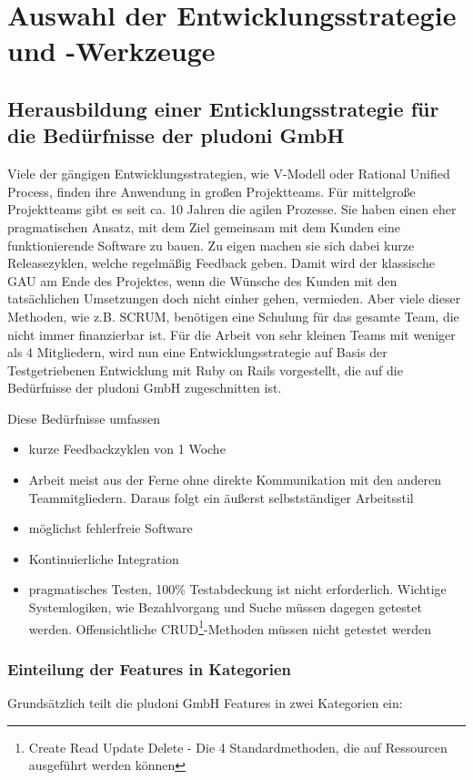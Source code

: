 \section{Auswahl der Entwicklungsstrategie und -Werkzeuge}
\subsection{Herausbildung einer Enticklungsstrategie für die Bedürfnisse der pludoni GmbH}
Viele der gängigen Entwicklungsstrategien, wie V-Modell oder Rational Unified Process, finden ihre Anwendung in großen Projektteams. Für mittelgroße Projektteams gibt es seit ca. 10 Jahren die agilen Prozesse. Sie haben einen eher pragmatischen Ansatz, mit dem Ziel gemeinsam mit dem Kunden eine funktionierende Software zu bauen. Zu eigen machen sie sich dabei kurze Releasezyklen, welche regelmäßig Feedback geben. Damit wird der klassische GAU am Ende des Projektes, wenn die Wünsche des Kunden mit den tatsächlichen Umsetzungen doch nicht einher gehen, vermieden. Aber viele dieser Methoden, wie z.B. SCRUM, benötigen eine Schulung für das gesamte Team, die nicht immer finanzierbar ist. 
Für die Arbeit von sehr kleinen Teams mit weniger als 4 Mitgliedern, wird nun eine Entwicklungsstrategie auf Basis der Testgetriebenen Entwicklung mit Ruby on Rails vorgestellt, die auf die Bedürfnisse der pludoni GmbH zugeschnitten ist.

Diese Bedürfnisse umfassen 
\begin{itemize}
 \item kurze Feedbackzyklen von 1 Woche
 \item Arbeit meist aus der Ferne ohne direkte Kommunikation mit den anderen Teammitgliedern. Daraus folgt ein äußerst selbstständiger Arbeitsstil
 \item möglichst fehlerfreie Software
 \item Kontinuierliche Integration
 \item pragmatisches Testen, 100\% Testabdeckung ist nicht erforderlich. Wichtige Systemlogiken, wie Bezahlvorgang und Suche müssen dagegen getestet werden. Offensichtliche CRUD\footnote{Create Read Update Delete - Die 4 Standardmethoden, die auf Ressourcen ausgeführt werden können}-Methoden müssen nicht getestet werden
 
\end{itemize}

\subsubsection{Einteilung der Features in Kategorien}
Grundsätzlich teilt die pludoni GmbH Features in zwei Kategorien ein:


